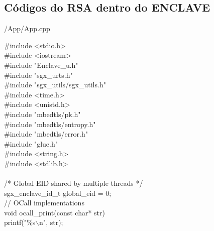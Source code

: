 
\begin{apendicesenv}

\partapendices

\chapter{Códigos do RSA dentro do ENCLAVE}
\label{ap cod rsa enclave}

/App/App.cpp

\#include <stdio.h>\\
\#include <iostream>\\
\#include "Enclave\_u.h"\\
\#include "sgx\_urts.h"\\
\#include "sgx\_utils/sgx\_utils.h"\\
\#include <time.h>\\
\#include <unistd.h>\\ 
\#include "mbedtls/pk.h"\\
\#include "mbedtls/entropy.h"\\
\#include "mbedtls/error.h"\\
\#include "glue.h"\\
\#include <string.h>\\
\#include <stdlib.h>\\
\\

/* Global EID shared by multiple threads */\\
sgx\_enclave\_id\_t global\_eid = 0;\\

// OCall implementations\\
void ocall\_print(const char* str) {\\
    printf("\%s$\backslash$n", str);\\
}\\






\end{apendicesenv}
